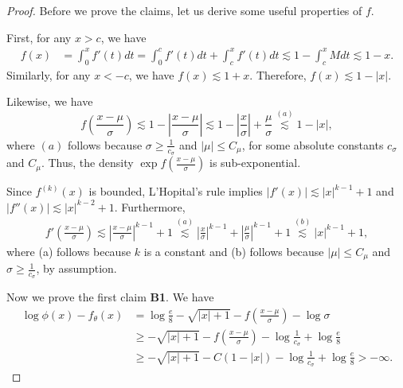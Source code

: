 \documentclass{article}
\begin{document}
\begin{proof}

Before we prove the claims, let us derive some useful properties of $f$. 

First, for any $x > c$, we have
\begin{align*}
f(x) &= \int_0^x f'(t) dt = \int_0^c f'(t) dt + \int_c^x f'(t) dt \lesssim 1 -  \int_c^x M dt \lesssim 1 - x.
\end{align*}
Similarly, for any $x < -c$, we have $f(x) \lesssim 1 + x$. Therefore, $f(x) \lesssim 1 - |x|$. 

Likewise, we have
\[
f\left( \frac{x - \mu}{\sigma} \right) \lesssim 1 - \left| \frac{x - \mu}{\sigma} \right| 
         \lesssim 1 - \left| \frac{x}{\sigma} \right| + \frac{\mu}{\sigma} 
     \stackrel{(a)} \lesssim 1 - |x|,
\]
where $(a)$ follows because $\sigma \geq \frac{1}{c_\sigma}$ and $|\mu| \leq C_\mu$, for some absolute constants $c_\sigma$ and $C_\mu$. Thus, the density $\exp f\left( \frac{x - \mu}{\sigma} \right)$ is sub-exponential. 

Since $f^{(k)}(x)$ is bounded, L'Hopital's rule implies $|f'(x)| \lesssim |x|^{k-1} + 1$ and $|f''(x)| \lesssim |x|^{k-2} + 1$. Furthermore,
\begin{align}
f'\left( \frac{x - \mu}{\sigma} \right) \lesssim \left| \frac{x -\mu}{\sigma} \right|^{k-1} + 1 
           \stackrel{(a)} \lesssim \left| \frac{x}{\sigma} \right|^{k-1} + \left| \frac{\mu}{\sigma} \right|^{k-1} + 1
  \stackrel{(b)}  \lesssim |x|^{k-1} + 1, \label{eqn:fprime_bound}
\end{align}
where (a) follows because $k$ is a constant and (b) follows because $|\mu| \leq C_\mu$ and $\sigma \geq \frac{1}{c_\sigma}$, by assumption. 

Now we prove the first claim \textbf{B1}. We have
\begin{align*}
\log \phi (x) - f_\theta(x) &= \log \frac{e}{8} - \sqrt{|x| + 1} - f\left( \frac{x - \mu}{\sigma} \right) - \log \sigma \\
              & \geq  - \sqrt{|x| + 1} - f\left( \frac{x - \mu}{\sigma} \right) - \log \frac{1}{c_{\sigma}} + \log \frac{e}{8}  \\
        &\geq- \sqrt{|x| +1} - C (1 - |x|) -  \log \frac{1}{c_{\sigma}} + \log \frac{e}{8} > - \infty.
\end{align*}


\end{proof}
\end{document}
